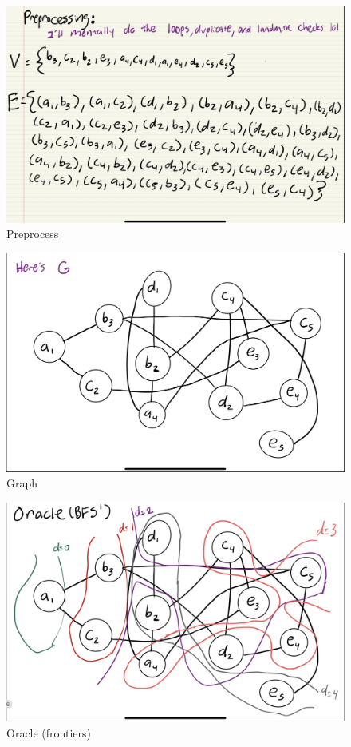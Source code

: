 \documentclass[11pt]{article}
\begin{document}
\begin{enumerate}
\begin{figure}[H]
    \centering
    \includegraphics[width=.75\linewidth]{IMG_0130.jpg}
    \caption{Preprocess}
    \label{fig:preprocess}
\end{figure}

\begin{figure}[H]
    \centering
    \includegraphics[width=.75\linewidth]{IMG_0131.jpg}
    \caption{Graph}
    \label{fig:graph}
\end{figure}

\begin{figure}[H]
    \centering
    \includegraphics[width=.75\linewidth]{IMG_0132.jpg}
    \caption{Oracle (frontiers)}
    \label{fig:oracle-frontiers}
\end{figure}


\end{enumerate}
\end{document}
